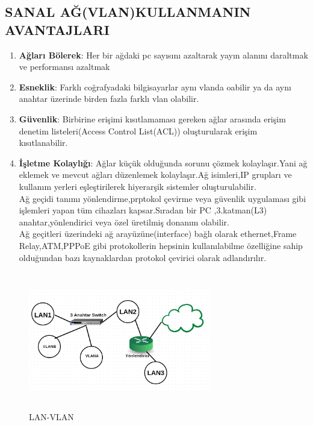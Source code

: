 \subsection*{SANAL AĞ(VLAN)KULLANMANIN AVANTAJLARI}
\begin{enumerate}[label=\alph*)]
    \item \textbf{Ağları Bölerek}: Her bir ağdaki pc sayısını azaltarak yayın alanını daraltmak ve performansı azaltmak
    \item \textbf{Esneklik}: Farklı coğrafyadaki bilgisayarlar aynı vlanda oabilir ya da aynı anahtar üzerinde birden fazla farklı vlan olabilir.
    \item \textbf{Güvenlik}: Birbirine erişimi kısıtlamaması gereken ağlar arasında erişim denetim listeleri(Access Control List(ACL)) oluşturularak erişim kısıtlanabilir.
    \item \textbf{İşletme Kolaylığı}: Ağlar küçük olduğunda sorunu çözmek kolaylaşır.Yani ağ eklemek ve mevcut ağları düzenlemek kolaylaşır.Ağ isimleri,IP grupları ve kullanım yerleri eşleştirilerek hiyerarşik sistemler oluşturulabilir.\\
    Ağ geçidi tanımı yönlendirme,prptokol çevirme veya güvenlik uygulaması gibi işlemleri yapan tüm cihazları kapsar.Sıradan bir PC ,3.katman(L3) anahtar,yönlendirici veya özel üretilmiş donanım olabilir.\\
    Ağ geçitleri üzerindeki ağ arayüzüne(interface) bağlı olarak ethernet,Frame Relay,ATM,PPPoE gibi protokollerin hepsinin kullanılabilme özelliğine sahip olduğundan bazı kaynaklardan protokol çevirici olarak adlandırılır.
\end{enumerate}
\begin{figure}[ht]
    \centering
    \includegraphics[width=8cm,height=6cm]{images/Vlanlar}
    \caption{LAN-VLAN}
    \label{fig:lan_vlan_sorusu}
\end{figure}



